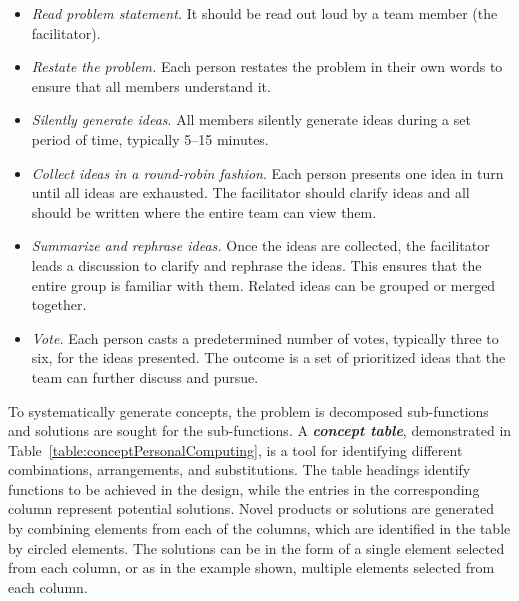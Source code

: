 \begin{itemize}
\item
  \emph{Read problem statement.} It should be read out loud by a team
  member (the facilitator).
\item
  \emph{Restate the problem.} Each person restates the problem in their
  own words to ensure that all members understand it.
\item
  \emph{Silently generate ideas}. All members silently generate ideas
  during a set period of time, typically 5--15 minutes.
\item
  \emph{Collect ideas in a round-robin fashion}. Each person presents
  one idea in turn until all ideas are exhausted. The facilitator should
  clarify ideas and all should be written where the entire team can view
  them.
\item
  \emph{Summarize and rephrase ideas.} Once the ideas are collected, the
  facilitator leads a discus­sion to clarify and rephrase the ideas. This
  ensures that the entire group is familiar with them. Related ideas can
  be grouped or merged together.
\item
  \emph{Vote.} Each person casts a predetermined number of votes,
  typically three to six, for the ideas presented. The outcome is a set
  of prioritized ideas that the team can further discuss and pursue.
\end{itemize}

To systematically generate concepts, the problem is decomposed
sub-functions and solutions are sought for the sub-functions. A
\emph{\textbf{concept table}}, demonstrated in 
Table~\ref{table:conceptPersonalComputing}, is a tool for
identifying different combinations, arrangements, and substitutions. The
table headings identify functions to be achieved in the design, while
the entries in the corresponding column represent po­tential solutions.
Novel products or solutions are generated by combining elements from
each of the columns, which are identified in the table by circled
elements. The solutions can be in the form of a single element selected
from each column, or as in the example shown, multiple elements selected
from each column.

